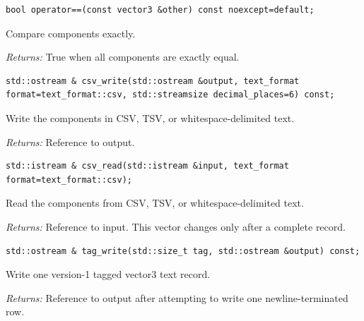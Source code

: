 \par\noindent\begin{minipage}{\linewidth}
\begin{lstlisting}[style=apireference]
bool operator==(const vector3 &other) const noexcept=default;
\end{lstlisting}
{\footnotesize Compare components exactly.\par}
{\footnotesize\textit{Returns:} True when all components are exactly equal.\par}
\end{minipage}\par\vspace{1pt}
\par\noindent\begin{minipage}{\linewidth}
\begin{lstlisting}[style=apireference]
std::ostream & csv_write(std::ostream &output, text_format format=text_format::csv, std::streamsize decimal_places=6) const;
\end{lstlisting}
{\footnotesize Write the components in CSV, TSV, or whitespace-delimited text.\par}
{\footnotesize\textit{Returns:} Reference to output.\par}
\end{minipage}\par\vspace{1pt}
\par\noindent\begin{minipage}{\linewidth}
\begin{lstlisting}[style=apireference]
std::istream & csv_read(std::istream &input, text_format format=text_format::csv);
\end{lstlisting}
{\footnotesize Read the components from CSV, TSV, or whitespace-delimited text.\par}
{\footnotesize\textit{Returns:} Reference to input. This vector changes only after a complete record.\par}
\end{minipage}\par\vspace{1pt}
\par\noindent\begin{minipage}{\linewidth}
\begin{lstlisting}[style=apireference]
std::ostream & tag_write(std::size_t tag, std::ostream &output) const;
\end{lstlisting}
{\footnotesize Write one version-1 tagged vector3 text record.\par}
{\footnotesize\textit{Returns:} Reference to output after attempting to write one newline-terminated row.\par}
\end{minipage}\par\vspace{1pt}
